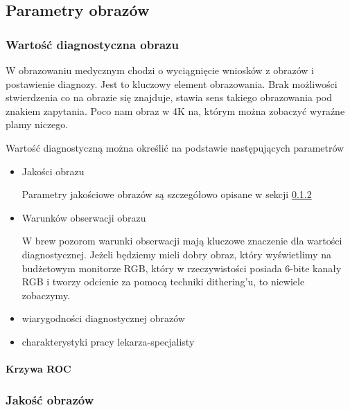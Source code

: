 \subsection{Parametry obrazów}

\subsubsection{Wartość diagnostyczna obrazu}

W obrazowaniu medycznym chodzi o wyciągnięcie wniosków z obrazów i postawienie diagnozy.
Jest to kluczowy element obrazowania.
Brak możliwości stwierdzenia co na obrazie się znajduje, stawia sens takiego obrazowania pod znakiem zapytania.
Poco nam obraz w 4K na, którym można zobaczyć wyraźne plamy niczego.

Wartość diagnostyczną można określić na podstawie następujących parametrów
\begin{itemize}
    \item Jakości obrazu
    
    Parametry jakościowe obrazów są szczegółowo opisane w sekcji \ref{sec:image-quality}

    \item Warunków obserwacji obrazu

    W brew pozorom warunki obserwacji mają kluczowe znaczenie dla wartości diagnostycznej.
    Jeżeli będziemy mieli dobry obraz, który wyświetlimy na budżetowym monitorze RGB, który w rzeczywistości posiada 6-bite kanały RGB i tworzy odcienie za pomocą techniki dithering'u, to niewiele zobaczymy.

    \item wiarygodności diagnostycznej obrazów

    \item charakterystyki pracy lekarza-specjalisty

\end{itemize}

\paragraph{Krzywa ROC}

\subsubsection{Jakość obrazów}
\label{sec:image-quality}

